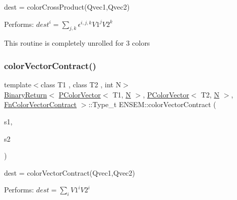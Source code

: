 dest = color\+Cross\+Product(\+Qvec1,\+Qvec2) 

Performs\+: $dest^{i} = \sum_{j,k} \epsilon^{i,j,k} V1^{j} V2^{k}$

This routine is completely unrolled for 3 colors \mbox{\label{namespaceENSEM_a666da055f6c28926add4d2570dc0e679}} 
\subsubsection{\texorpdfstring{colorVectorContract()}{colorVectorContract()}}
{\footnotesize\ttfamily template$<$class T1 , class T2 , int N$>$ \\
\mbox{\hyperlink{structENSEM_1_1BinaryReturn}{Binary\+Return}}$<$ \mbox{\hyperlink{classENSEM_1_1PColorVector}{P\+Color\+Vector}}$<$ T1, \mbox{\hyperlink{operator__name__util_8cc_a7722c8ecbb62d99aee7ce68b1752f337}{N}} $>$, \mbox{\hyperlink{classENSEM_1_1PColorVector}{P\+Color\+Vector}}$<$ T2, \mbox{\hyperlink{operator__name__util_8cc_a7722c8ecbb62d99aee7ce68b1752f337}{N}} $>$, \mbox{\hyperlink{structENSEM_1_1FnColorVectorContract}{Fn\+Color\+Vector\+Contract}} $>$\+::Type\+\_\+t E\+N\+S\+E\+M\+::color\+Vector\+Contract (\begin{DoxyParamCaption}\item[{const \mbox{\hyperlink{classENSEM_1_1PColorVector}{P\+Color\+Vector}}$<$ T1, \mbox{\hyperlink{operator__name__util_8cc_a7722c8ecbb62d99aee7ce68b1752f337}{N}} $>$ \&}]{s1,  }\item[{const \mbox{\hyperlink{classENSEM_1_1PColorVector}{P\+Color\+Vector}}$<$ T2, \mbox{\hyperlink{operator__name__util_8cc_a7722c8ecbb62d99aee7ce68b1752f337}{N}} $>$ \&}]{s2 }\end{DoxyParamCaption})\hspace{0.3cm}{\ttfamily [inline]}}



dest = color\+Vector\+Contract(\+Qvec1,\+Qvec2) 

Performs\+: $dest = \sum_{i} V1^{i} V2^{i}$ \mbox{\label{namespaceENSEM_a8a53ef224c8fabaae4e9319588554b96}} 
